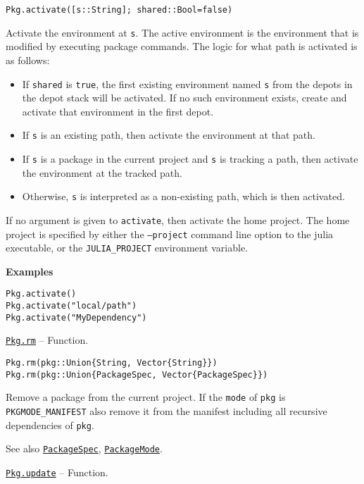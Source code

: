 \begin{adjustwidth}{2em}{0pt}


\begin{verbatim}
Pkg.activate([s::String]; shared::Bool=false)
\end{verbatim}

Activate the environment at \texttt{s}. The active environment is the environment that is modified by executing package commands. The logic for what path is activated is as follows:

\begin{itemize}
\item If \texttt{shared} is \texttt{true}, the first existing environment named \texttt{s} from the depots in the depot stack will be activated. If no such environment exists, create and activate that environment in the first depot.


\item If \texttt{s} is an existing path, then activate the environment at that path.


\item If \texttt{s} is a package in the current project and \texttt{s} is tracking a path, then activate the environment at the tracked path.


\item Otherwise, \texttt{s} is interpreted as a non-existing path, which is then activated.

\end{itemize}
If no argument is given to \texttt{activate}, then activate the home project. The home project is specified by either the \texttt{--project} command line option to the julia executable, or the \texttt{JULIA\_PROJECT} environment variable.

\textbf{Examples}


\begin{lstlisting}
Pkg.activate()
Pkg.activate("local/path")
Pkg.activate("MyDependency")
\end{lstlisting}



\end{adjustwidth}
\hypertarget{4147981366221469810}{} 
\hyperlink{4147981366221469810}{\texttt{Pkg.rm}}  -- {Function.}

\begin{adjustwidth}{2em}{0pt}


\begin{verbatim}
Pkg.rm(pkg::Union{String, Vector{String}})
Pkg.rm(pkg::Union{PackageSpec, Vector{PackageSpec}})
\end{verbatim}

Remove a package from the current project. If the \texttt{mode} of \texttt{pkg} is \texttt{PKGMODE\_MANIFEST} also remove it from the manifest including all recursive dependencies of \texttt{pkg}.

See also \hyperlink{7769325907319883786}{\texttt{PackageSpec}}, \hyperlink{3271836720350904911}{\texttt{PackageMode}}.



\end{adjustwidth}
\hypertarget{10543171283952432470}{} 
\hyperlink{10543171283952432470}{\texttt{Pkg.update}}  -- {Function.}

